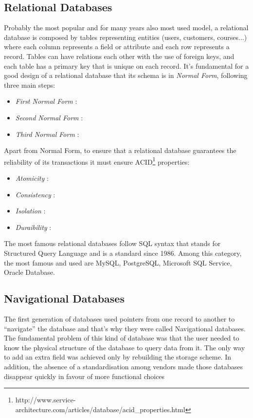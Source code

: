 \subsection{Relational Databases}
\label{sec:description}

Probably the most popular and for many years also most used model, a relational database is composed by tables representing entities (users, customers, courses...) where each column represents a field or attribute and each row represents a record.
Tables can have relations each other with the use of foreign keys, and each table has a primary key that is unique on each record.
It’s fundamental for a good design of a relational database that its schema is in \textit{Normal Form}, following three main steps:
\begin{itemize}
	\item \textit{First Normal Form} :
	\item \textit{Second Normal Form} :
	\item \textit{Third Normal Form} :
\end{itemize}
\newpage
Apart from Normal Form, to ensure that a relational database guarantees the reliability of its transactions it must ensure ACID\footnote{http://www.service-architecture.com/articles/database/acid\_properties.html} properties:
\begin{itemize}
	\item \textit{Atomicity} :
	\item \textit{Consistency} :
	\item \textit{Isolation} :
	\item \textit{Duraibility} :
\end{itemize}
The most famous relational databases follow SQL syntax that stands for Structured Query Language and is a standard since 1986.
Among this category, the most famous and used are MySQL, PostgreSQL, Microsoft SQL Service, Oracle Database.
\subsection{Navigational Databases}
The first generation of databases used pointers from one record to another to “navigate” the database and that’s why they were called Navigational databases.
The fundamental problem of this kind of database was that the user needed to know the physical structure of the database to query data from it. The only way to add an extra field was achieved only by rebuilding the storage scheme.
In addition, the absence of a standardisation among vendors made those databases disappear quickly in favour of more functional choices

